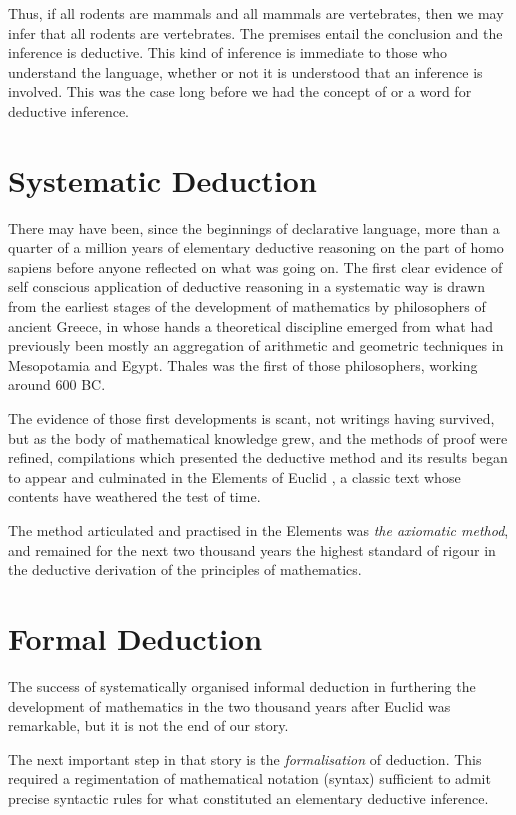 \documentclass[10pt,titlepage]{book}
\begin{document}
Thus, if all rodents are mammals and all mammals are vertebrates, then we may infer that all rodents are vertebrates.
The premises entail the conclusion and the inference is deductive.
This kind of inference is immediate to those who understand the language, whether or not it is understood that an inference is involved.
This was the case long before we had the concept of or a word for deductive inference.

\section{Systematic Deduction}

There may have been, since the beginnings of declarative language, more than a quarter of a million years of elementary deductive reasoning on the part of homo sapiens before anyone reflected on what was going on.
The first clear evidence of self conscious application of deductive reasoning in a systematic way is drawn from the earliest stages of the development of mathematics by philosophers of ancient Greece, in whose hands a theoretical discipline emerged from what had previously been mostly an aggregation of arithmetic and geometric techniques in Mesopotamia and Egypt.
Thales was the first of those philosophers, working around 600 BC.

The evidence of those first developments is scant, not writings having survived, but as the body of mathematical knowledge grew, and the methods of proof were refined, compilations which presented the deductive method and its results began to appear and culminated in the Elements of Euclid \cite{EuclidEL1}, a classic text whose contents have weathered the test of time.

The method articulated and practised in the Elements was \emph{the axiomatic method}, and remained for the next two thousand years the highest standard of rigour in the deductive derivation of the principles of mathematics.

\section{Formal Deduction}

The success of systematically organised informal deduction in furthering the development of mathematics in the two thousand years after Euclid was remarkable, but it is not the end of our story.

The next important step in that story is the \emph{formalisation} of
deduction.
This required a regimentation of mathematical notation (syntax) sufficient to admit precise syntactic rules for what constituted an elementary deductive inference.
\end{document}
